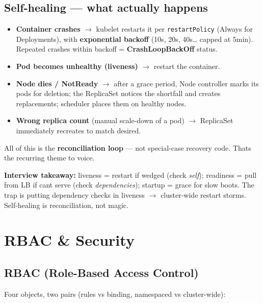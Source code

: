 \documentclass[11pt]{article}
\providecommand{\tightlist}{\setlength{\itemsep}{1pt}\setlength{\parskip}{0pt}}
\begin{document}
\subsection{Self-healing --- what actually happens}\label{self-healing--what-actually-happens}

\begin{itemize}
\tightlist
\item
  \textbf{Container crashes} \(\rightarrow\) kubelet restarts it per \texttt{restartPolicy} (Always for Deployments), with \textbf{exponential backoff} (10s, 20s, 40s\ldots{} capped at 5min). Repeated crashes within backoff = \textbf{CrashLoopBackOff} status.
\item
  \textbf{Pod becomes unhealthy (liveness)} \(\rightarrow\) restart the container.
\item
  \textbf{Node dies / NotReady} \(\rightarrow\) after a grace period, Node controller marks its pods for deletion; the ReplicaSet notices the shortfall and creates replacements; scheduler places them on healthy nodes.
\item
  \textbf{Wrong replica count} (manual scale-down of a pod) \(\rightarrow\) ReplicaSet immediately recreates to match desired.
\end{itemize}

All of this is the \textbf{reconciliation loop} --- not special-case recovery code. That\textquotesingle s the recurring theme to voice.

\textbf{Interview takeaway:} liveness = restart if wedged (check \emph{self}); readiness = pull from LB if can\textquotesingle t serve (check \emph{dependencies}); startup = grace for slow boots. The trap is putting dependency checks in liveness \(\rightarrow\) cluster-wide restart storms. Self-healing is reconciliation, not magic.

\section{RBAC \& Security}\label{rbac--security}

\subsection{RBAC (Role-Based Access Control)}\label{rbac-role-based-access-control}

Four objects, two pairs (rules vs binding, namespaced vs cluster-wide):

\end{document}
